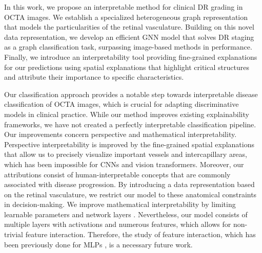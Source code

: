 In this work, we propose an interpretable method for clinical DR grading in OCTA images. We establish a specialized heterogeneous graph representation that models the particularities of the retinal vasculature. Building on this novel data representation, we develop an efficient GNN model that solves DR staging as a graph classification task, surpassing image-based methods in performance. Finally, we introduce an interpretability tool providing fine-grained explanations for our predictions using spatial explanations that highlight critical structures and attribute their importance to specific characteristics. 


Our classification approach provides a notable step towards interpretable disease classification of OCTA images, which is crucial for adapting discriminative models in clinical practice. 
While our method improves existing explainability frameworks, we have not created a perfectly interpretable classification pipeline. Our improvements concern perspective and mathematical interpretability. Perspective interpretability is improved by the fine-grained spatial explanations that allow us to precisely visualize important vessels and intercapillary areas, which has been impossible for CNNs and vision transformers. Moreover, our attributions consist of human-interpretable concepts that are commonly associated with disease progression. By introducing a data representation based on the retinal vasculature, we restrict our model to these anatomical constraints in decision-making. We improve mathematical interpretability by limiting learnable parameters and network layers \cite{barcelo2020model}. Nevertheless, our model consists of multiple layers with activations and numerous features, which allows for non-trivial feature interaction. Therefore, the study of feature interaction, which has been previously done for MLPs \cite{tsang2017detecting}, is a necessary future work. 



